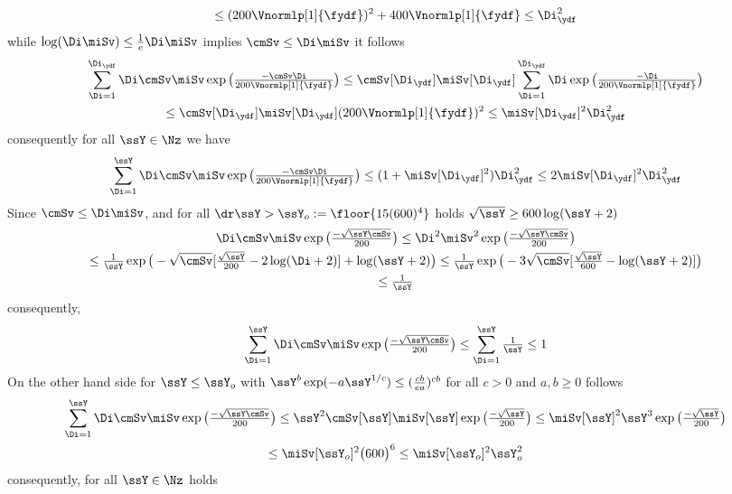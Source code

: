 \begin{pro}
\begin{multline*}
\\\leq
({200\Vnormlp[1]{\fydf}})^2+{400\Vnormlp[1]{\fydf}}\leq \Di_{\ydf}^2
\end{multline*}
while $\log(\Di\miSv)\leq \tfrac{1}{e}\Di\miSv$ implies
$\cmSv\leq\Di\miSv$ it follows
\begin{multline*}
  \sum_{\Di=1}^{\Di_{\ydf}}\Di\cmSv\miSv\exp\big(\tfrac{-\cmSv\Di}{200\Vnormlp[1]{\fydf}}\big)\leq
  \cmSv[\Di_{\ydf}]\miSv[\Di_{\ydf}]\sum_{\Di=1}^{\Di_{\ydf}}\Di\exp\big(\tfrac{-\Di}{200\Vnormlp[1]{\fydf}}\big)\\\leq
  \cmSv[\Di_{\ydf}]\miSv[\Di_{\ydf}]({200\Vnormlp[1]{\fydf}})^2\leq\miSv[\Di_{\ydf}]^2\Di_{\ydf}^2
\end{multline*}
consequently for all $\ssY\in\Nz$ we have
\begin{displaymath}
  \sum_{\Di=1}^{\ssY}\Di\cmSv\miSv\exp\big(\tfrac{-\cmSv\Di}{200\Vnormlp[1]{\fydf}}\big)\leq(1+\miSv[\Di_{\ydf}]^2)\Di_{\ydf}^2\leq 2\miSv[\Di_{\ydf}]^2\Di_{\ydf}^2
\end{displaymath}
Since  $\cmSv\leq\Di\miSv$,
and  for all $\dr \ssY>\ssY_{o}:=\floor{15({600})^4}$ holds $\sqrt{\ssY}\geq{600}\log(\ssY+2)$
\begin{multline*}
\Di\cmSv\miSv\exp\big(\tfrac{-\sqrt{\ssY\cmSv}}{200}\big)\leq
\Di^2\miSv^2\exp\big(\tfrac{-\sqrt{\ssY\cmSv}}{200}\big)\\\leq
\tfrac{1}{\ssY}\exp\big(-\sqrt{\cmSv}[\tfrac{\sqrt{\ssY}}{200}-2\log(\Di+2)]+\log(\ssY+2)\big)
\leq\tfrac{1}{\ssY}\exp\big(-3\sqrt{\cmSv}[\tfrac{\sqrt{\ssY}}{600}-\log(\ssY+2)]\big)
\\
\leq \tfrac{1}{\ssY}
  \end{multline*}
consequently, 
\begin{equation*}
\sum_{\Di=1}^{\ssY}\Di\cmSv\miSv\exp\big(\tfrac{-\sqrt{\ssY\cmSv}}{200}\big)\leq\sum_{\Di=1}^{\ssY}\tfrac{1}{\ssY}\leq1
\end{equation*}
On the other hand side for $\ssY\leq\ssY_{o}$ with  $\ssY^b\exp(-a\ssY^{1/c})\leq (\tfrac{cb}{ea})^{cb}$ for all $c>0$ and $a,b\geq0$  follows
\begin{multline*}
\sum_{\Di=1}^{\ssY}\Di\cmSv\miSv\exp\big(\tfrac{-\sqrt{\ssY\cmSv}}{200}\big)\leq\ssY^2\cmSv[\ssY]\miSv[\ssY]\exp\big(\tfrac{-\sqrt{\ssY}}{200}\big)\leq
\miSv[\ssY]^2\ssY^3\exp\big(\tfrac{-\sqrt{\ssY}}{200}\big)\\\leq \miSv[\ssY_{o}]^2\big({600}\big)^6\leq\miSv[\ssY_{o}]^2\ssY_{o}^2
\end{multline*}
 consequently, for all $\ssY\in\Nz$ holds
 \begin{displaymath}

\end{displaymath}
\end{pro}
